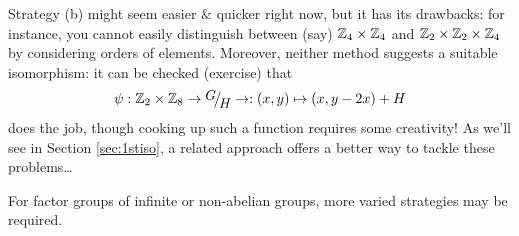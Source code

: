 	Strategy (b) might seem easier \& quicker right now, but it has its drawbacks: for instance, you cannot easily distinguish between (say) $\mathbb{Z}_4\times\mathbb{Z}_4$ and $\mathbb{Z}_2\times\mathbb{Z}_2\times\mathbb{Z}_4$ by considering orders of elements. Moreover, neither method suggests a suitable isomorphism: it can be checked (exercise) that
\[
	\psi:\Z_2\times\Z_8\to\quotient GH\to:(x,y)\mapsto (x,y-2x)+H
\]
does the job, though cooking up such a function requires some creativity! As we'll see in Section \ref{sec:1stiso}, a related approach offers a better way to tackle these problems\ldots 




For factor groups of infinite or non-abelian groups, more varied strategies may be required.

